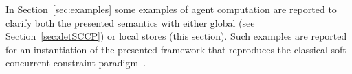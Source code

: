 \documentclass[main.tex]{subfiles}
\begin{document}


In Section~\ref{sec:examples} some examples of agent computation are reported to clarify both the presented semantics with either global (see Section~\ref{sec:detSCCP}) or local stores (this section). Such examples are reported for an instantiation of the presented framework that reproduces the classical soft concurrent constraint paradigm~\cite{scc}.
\end{document}
